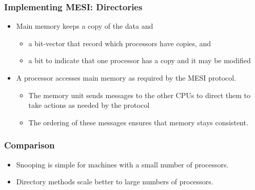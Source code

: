 \documentclass[../main.tex]{subfiles}
\begin{document}
\subsubsection{Implementing MESI: Directories}

\begin{itemize}
	\item Main memory keeps a copy of the data and
	      \begin{itemize}
		      \item a bit-vector that record which processors have copies, and
		      \item a bit to indicate that one processor has a copy and it may be modified
	      \end{itemize}
	\item A processor accesses main memory as required by the MESI protocol.
	      \begin{itemize}
		      \item The memory unit sends messages to the other CPUs to direct them to take actions as needed by the protocol
		      \item The ordering of these messages ensures that memory stays consistent.
	      \end{itemize}
\end{itemize}

\subsubsection{Comparison}
\begin{itemize}
	\item Snooping is simple for machines with a small number of processors.
	\item Directory methods scale better to large numbers of processors.
\end{itemize}
\end{document}
